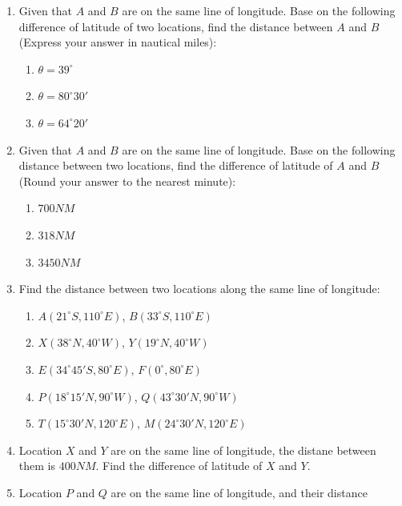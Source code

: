 \documentclass{report}
\begin{document}
\begin{multicols*}{2}
    \begin{enumerate}
        \item Given that $A$ and $B$ are on the same line of longitude. Base on the following
              difference of latitude of two locations, find the distance between $A$ and $B$
              (Express your answer in nautical miles):
              \begin{enumerate}
                  \item $\theta = 39^\circ$
                  \item $\theta = 80^\circ 30'$
                  \item $\theta = 64^\circ 20'$
              \end{enumerate}
        \item Given that $A$ and $B$ are on the same line of longitude. Base on the following
              distance between two locations, find the difference of latitude of $A$ and $B$
              (Round your answer to the nearest minute):
              \begin{enumerate}
                  \item $700NM$
                  \item $318NM$
                  \item $3450NM$
              \end{enumerate}
        \item Find the distance between two locations along the same line of longitude:
              \begin{enumerate}
                  \item $A(21^\circ S, 110^\circ E)$, $B(33^\circ S, 110^\circ E)$
                  \item $X(38^\circ N, 40^\circ W)$, $Y(19^\circ N, 40^\circ W)$
                  \item $E(34^\circ 45' S, 80^\circ E)$, $F(0^\circ, 80^\circ E)$
                  \item $P(18^\circ 15' N, 90^\circ W)$, $Q(43^\circ 30' N, 90^\circ W)$
                  \item $T(15^\circ 30' N, 120^\circ E)$, $M(24^\circ 30' N, 120^\circ E)$
              \end{enumerate}
        \item Location $X$ and $Y$ are on the same line of longitude, the distane between
              them is $400NM$. Find the difference of latitude of $X$ and $Y$.
        \item Location $P$ and $Q$ are on the same line of longitude, and their distance

\end{enumerate}
\end{multicols*}
\end{document}

